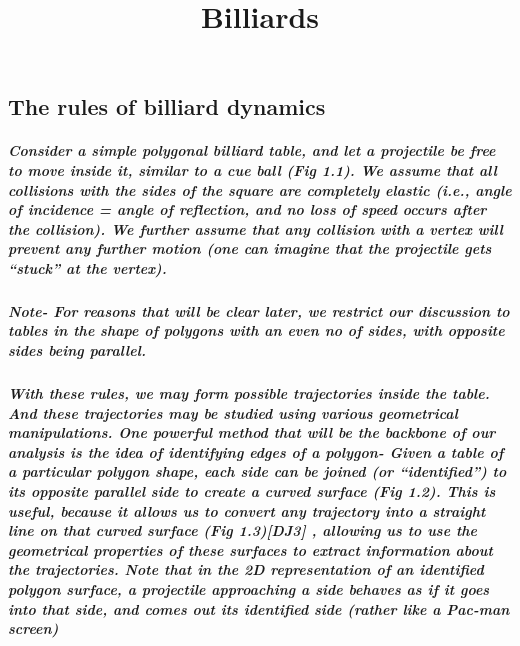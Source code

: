 \documentclass{report}
\title{Billiards}
\begin{document}
\maketitle
\newpage
\tableofcontents

\chapter{}


\section{The rules of billiard dynamics}
\paragraph{Consider a simple polygonal billiard table, and let a projectile be free to move inside it, similar to a cue ball (Fig 1.1). We assume that all collisions with the sides of the square are completely elastic (i.e., angle of incidence = angle of reflection, and no loss of speed occurs after the collision). We further assume that any collision with a vertex will prevent any further motion (one can imagine that the projectile gets “stuck” at the vertex).}



\paragraph{Note- For reasons that will be clear later, we restrict our discussion to tables in the shape of polygons with an even no of sides, with opposite sides being parallel.}
 
\paragraph{With these rules, we may form possible trajectories inside the table. And these trajectories may be studied using various geometrical manipulations. One powerful method that will be the backbone of our analysis is the idea of identifying edges of a polygon- Given a table of a particular polygon shape, each side can be joined (or “identified”) to its opposite parallel side to create a curved surface (Fig 1.2). This is useful, because it allows us to convert any trajectory into a straight line on that curved surface (Fig 1.3)[DJ3] , allowing us to use the geometrical properties of these surfaces to extract information about the trajectories. Note that in the 2D representation of an identified polygon surface, a projectile approaching a side behaves as if it goes into that side, and comes out its identified side (rather like a Pac-man screen)}
\end{document}
